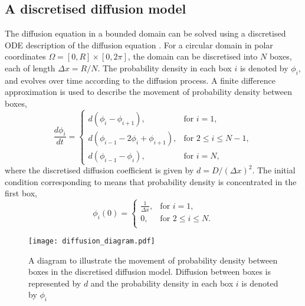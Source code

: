 \subsection{A discretised diffusion model} \label{discretised_model}

The diffusion equation in a bounded domain can be solved using a discretised ODE
description of the diffusion equation \cite{woolley2011stochastic}. For a circular domain in polar coordinates $\Omega = [0,R] \times [0, 2\pi]$, the domain can be discretised into $N$ boxes, each of
length $\Delta x=R/N$. The probability density in each box $i$ is denoted by $\phi_i$, and evolves over time according to the diffusion process. A finite difference approximation is used to describe the movement of probability density between boxes,
%
\begin{equation}
\frac{d\phi_i}{dt} = \begin{cases}
		d(\phi_i - \phi_{i+1}), & \text{for } i = 1, \\
		d(\phi_{i-1}-2\phi_i +\phi_{i+1}), & \text{for } 2 \leq i \leq N-1, \\
		d(\phi_{i-1}-\phi_i), & \text{for } i = N ,
		\end{cases}
        \label{eqn:discrete_diffusion}
\end{equation}
%
where the discretised diffusion coefficient is given by
$d = D/(\Delta x)^2$. The initial condition corresponding to  means that probability density is concentrated in the first box,
%
\begin{equation}
\phi_i(0) = \begin{cases}
		\frac{1}{\Delta x}, & \text{for } i = 1, \\
		0, & \text{for } 2 \leq i \leq N. \\
		\end{cases}
        \label{eqn:discrete_diffusion_IC}
\end{equation}
%
\begin{figure} [t]
    \centering
        \texttt{[image: diffusion\_diagram.pdf]}
        \caption{A diagram to illustrate the movement of probability density between boxes in the discretised diffusion model. Diffusion between boxes is represented by $d$ and the probability density in each box $i$ is denoted by $\phi_i$}
    \label{fig:diffusion_diagram}
\end{figure}

